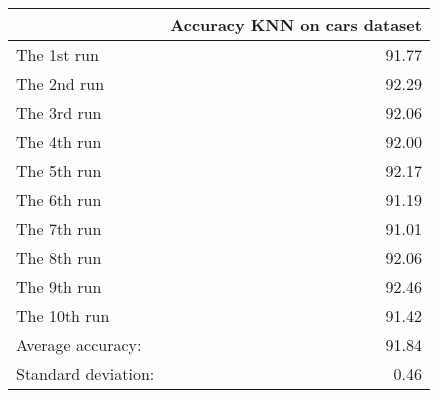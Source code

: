 \begin{tabular}{lr}
\toprule
{} &  Accuracy KNN on cars dataset \\
\midrule
The 1st run         &                         91.77 \\
The 2nd run         &                         92.29 \\
The 3rd run         &                         92.06 \\
The 4th run         &                         92.00 \\
The 5th run         &                         92.17 \\
The 6th run         &                         91.19 \\
The 7th run         &                         91.01 \\
The 8th run         &                         92.06 \\
The 9th run         &                         92.46 \\
The 10th run        &                         91.42 \\
Average accuracy:   &                         91.84 \\
Standard deviation: &                          0.46 \\
\bottomrule
\end{tabular}
